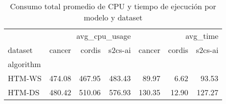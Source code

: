 \begin{table}
\caption{Consumo total promedio de CPU y tiempo de ejecución por modelo y dataset}
\label{tab:cpu_total_usage}
\begin{tabular}{lrrrrrr}
\toprule
 & \multicolumn{3}{r}{avg_cpu_usage} & \multicolumn{3}{r}{avg_time} \\
dataset & cancer & cordis & s2cs-ai & cancer & cordis & s2cs-ai \\
algorithm &  &  &  &  &  &  \\
\midrule
HTM-WS & 474.08 & 467.95 & 483.43 & 89.97 & 6.62 & 93.53 \\
HTM-DS & 480.42 & 510.06 & 576.93 & 130.35 & 12.90 & 127.27 \\
\bottomrule
\end{tabular}
\end{table}
